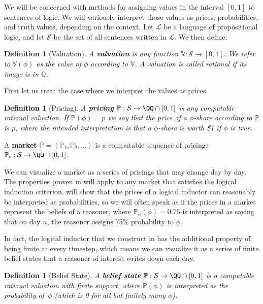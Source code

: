 \documentclass[authordate,onecolumn,noenvironments]{miri-tech-article}
\newtheorem{definition}[theorem]{Definition}
\numberwithin{equation}{subsection}
\newcommand{\seq}[1]{{\overline{#1}}}
\newcommand{\price}{p}
\newcommand{\nn}{n}
\newcommand{\lic}{logical induction criterion}
\newcommand{\BelState}{\mathbb{P}}
\newcommand{\Valuation}{\mathbb{V}}
\newcommand{\Market}{\seq{\Pricing}}
\newcommand{\Pricing}{\mathbb{P}}
\newcommand{\pt}{\BelState}
\newcommand{\Lang}{\mathcal{L}}
\newcommand{\Sentences}{\mathcal{S}}
\begin{document}
We will be concerned with methods for assigning values in the interval $[0, 1]$ to sentences of logic. We will variously interpret those values as prices, probabilities, and truth values, depending on the context. Let $\Lang$ be a language of propositional logic, and let $\Sentences$ be the set of all sentences written in $\Lang$. We then define:

\begin{definition}[Valuation]\label{def:market}
  A \textbf{valuation} is any function $\Valuation : \Sentences \to [0, 1]$.  We refer to $\Valuation(\phi)$ as the value of $\phi$ according to $\Valuation$. A valuation is called rational if its image is in $\mathbb{Q}$.
\end{definition}

\noindent First let us treat the case where we interpret the values as prices.

\begin{definition}[Pricing]\label{def:pricing}
  A \textbf{pricing} $\Pricing : \Sentences \to \QQ \cap [0, 1]$ is any computable rational valuation. If $\Pricing(\phi)=\price$ we say that the price of a $\phi$-share according to $\Pricing$ is $\price$, where the intended interpretation is that a $\phi$-share is worth \$1 if $\phi$ is true.
\end{definition}

\begin{keydef}[Market]\label{def:marketprocess}
  A \textbf{market} $\Market=(\Pricing_1,\Pricing_2,\ldots)$ is a computable sequence of pricings $\Pricing_i : \Sentences \to \QQ \cap [0,1]$.
\end{keydef}

\noindent We can visualize a market as a series of pricings that may change day by day.  The properties proven in  will apply to any market that satisfies the \lic{}.  will show that the prices of a logical inductor can reasonably be interpreted as probabilities, so we will often speak as if the prices in a market represent the beliefs of a reasoner, where $\pt_\nn(\phi)=0.75$ is interpreted as saying that on day $\nn$, the reasoner assigns 75\% probability to $\phi$.

In fact, the logical inductor that we construct in  has the additional property of being finite at every timestep, which means we can visualize it as a series of finite belief states that a reasoner of interest writes down each day.

\begin{definition}[Belief State]\label{def:belstate}
  A \textbf{belief state} $\BelState : \Sentences \to \QQ \cap [0, 1]$ is a computable rational valuation with finite support, where $\BelState(\phi)$ is interpreted as the probability of~$\phi$ (which is 0 for all but finitely many $\phi$).
\end{definition}
\end{document}
